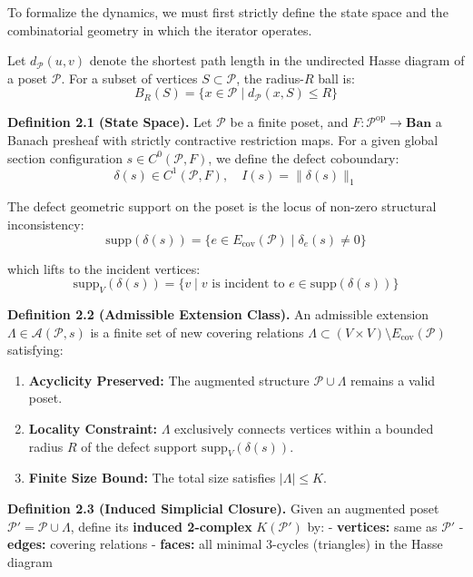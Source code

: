 \documentclass[
]{article}
\providecommand{\tightlist}{%
  \setlength{\itemsep}{0pt}\setlength{\parskip}{0pt}}
\begin{document}
To formalize the dynamics, we must first strictly define the state space
and the combinatorial geometry in which the iterator operates.

Let \(d_{\mathcal{P}}(u,v)\) denote the shortest path length in the
undirected Hasse diagram of a poset \(\mathcal{P}\). For a subset of
vertices \(S \subset \mathcal{P}\), the radius-\(R\) ball is:
\[B_R(S) = \{x \in \mathcal{P} \mid d_{\mathcal{P}}(x, S) \leq R\}\]

\textbf{Definition 2.1 (State Space).} Let \(\mathcal{P}\) be a finite
poset, and \(F: \mathcal{P}^{\text{op}} \to \mathbf{Ban}\) a Banach
presheaf with strictly contractive restriction maps. For a given global
section configuration \(s \in C^0(\mathcal{P}, F)\), we define the
defect coboundary:
\[\delta(s) \in C^1(\mathcal{P}, F), \quad I(s) = \|\delta(s)\|_1\]

The defect geometric support on the poset is the locus of non-zero
structural inconsistency:
\[\mathrm{supp}(\delta(s)) = \{ e \in E_{\text{cov}}(\mathcal{P}) \mid \delta_e(s) \neq 0 \}\]

which lifts to the incident vertices:
\[\mathrm{supp}_V(\delta(s)) = \{ v \mid v \text{ is incident to } e \in \mathrm{supp}(\delta(s)) \}\]

\textbf{Definition 2.2 (Admissible Extension Class).} An admissible
extension \(\Lambda \in \mathcal{A}(\mathcal{P}, s)\) is a finite set of
new covering relations
\(\Lambda \subset (V \times V) \setminus E_{\text{cov}}(\mathcal{P})\)
satisfying:

\begin{enumerate}
\def\labelenumi{\arabic{enumi}.}
\tightlist
\item
  \textbf{Acyclicity Preserved:} The augmented structure
  \(\mathcal{P} \cup \Lambda\) remains a valid poset.
\item
  \textbf{Locality Constraint:} \(\Lambda\) exclusively connects
  vertices within a bounded radius \(R\) of the defect support
  \(\mathrm{supp}_V(\delta(s))\).
\item
  \textbf{Finite Size Bound:} The total size satisfies
  \(|\Lambda| \leq K\).
\end{enumerate}

\textbf{Definition 2.3 (Induced Simplicial Closure).} Given an augmented
poset \(\mathcal{P}' = \mathcal{P} \cup \Lambda\), define its
\textbf{induced 2-complex} \(K(\mathcal{P}')\) by: - \textbf{vertices:}
same as \(\mathcal{P}'\) - \textbf{edges:} covering relations -
\textbf{faces:} all minimal 3-cycles (triangles) in the Hasse diagram
\end{document}
